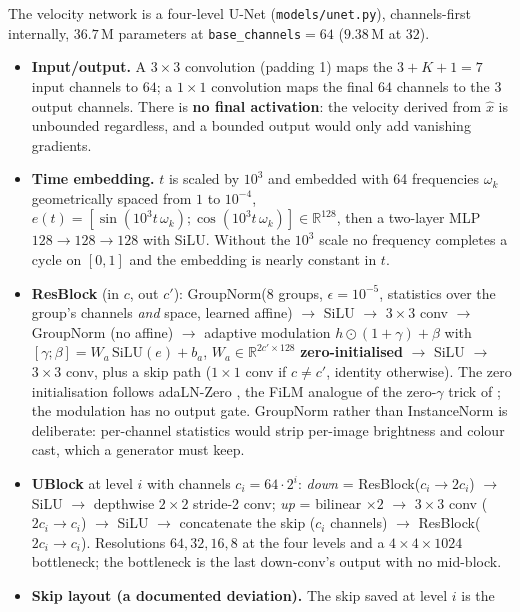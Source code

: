 \documentclass[11pt]{article}
\newcommand{\Rb}{\mathbb{R}}
\newcommand{\xh}{\hat{x}}
\begin{document}
The velocity network is a four-level U-Net (\texttt{models/unet.py}), channels-first
internally, $36.7$\,M parameters at \texttt{base\_channels}$=64$ ($9.38$\,M at $32$).
\begin{itemize}[leftmargin=1.5em,itemsep=1pt]
\item \textbf{Input/output.} A $3\times3$ convolution (padding 1) maps the
      $3+K+1=7$ input channels to $64$; a $1\times1$ convolution maps the final $64$
      channels to the $3$ output channels. There is \textbf{no final activation}: the
      velocity derived from $\xh$ is unbounded regardless, and a bounded output would
      only add vanishing gradients.
\item \textbf{Time embedding.} $t$ is scaled by $10^3$ and embedded with 64
      frequencies $\omega_k$ geometrically spaced from $1$ to $10^{-4}$,
      $e(t)=[\sin(10^3 t\,\omega_k);\cos(10^3 t\,\omega_k)]\in\Rb^{128}$, then a
      two-layer MLP $128\to128\to128$ with SiLU. Without the $10^3$ scale no frequency
      completes a cycle on $[0,1]$ and the embedding is nearly constant in $t$.
\item \textbf{ResBlock} (in $c$, out $c'$): GroupNorm(8 groups, $\epsilon=10^{-5}$,
      statistics over the group's channels \emph{and} space, learned affine) $\to$ SiLU
      $\to$ $3\times3$ conv $\to$ GroupNorm (no affine) $\to$ adaptive modulation
      $h\odot(1+\gamma)+\beta$ with $[\gamma;\beta]=W_a\,\mathrm{SiLU}(e)+b_a$,
      $W_a\in\Rb^{2c'\times128}$ \textbf{zero-initialised} $\to$ SiLU $\to$ $3\times3$
      conv, plus a skip path ($1\times1$ conv if $c\neq c'$, identity otherwise). The
      zero initialisation follows adaLN-Zero \citep{peebles2023dit}, the FiLM analogue
      of the zero-$\gamma$ trick of \citet{wu2018gn}; the modulation has no output
      gate. GroupNorm \citep{wu2018gn} rather than InstanceNorm is deliberate: per-channel
      statistics would strip per-image brightness and colour cast, which a generator
      must keep.
\item \textbf{UBlock} at level $i$ with channels $c_i=64\cdot2^i$: \emph{down} =
      ResBlock($c_i\to2c_i$) $\to$ SiLU $\to$ depthwise $2\times2$ stride-2 conv;
      \emph{up} = bilinear $\times2$ $\to$ $3\times3$ conv ($2c_i\to c_i$) $\to$ SiLU
      $\to$ concatenate the skip ($c_i$ channels) $\to$ ResBlock($2c_i\to c_i$).
      Resolutions $64,32,16,8$ at the four levels and a $4\times4\times1024$
      bottleneck; the bottleneck is the last down-conv's output with no mid-block.
\item \textbf{Skip layout (a documented deviation).} The skip saved at level $i$ is the

\end{itemize}
\end{document}
